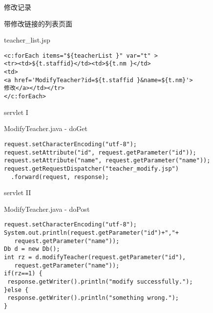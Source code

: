 \documentclass{beamer}
\begin{document}
\begin{frame}{修改记录}

\end{frame}
\begin{frame}[fragile]{带修改链接的列表页面}
\begin{block}{teacher\_list.jsp}
\begin{verbatim}
<c:forEach items="${teacherList }" var="t" >
<tr><td>${t.staffid}</td><td>${t.nm }</td>
<td>
<a href='ModifyTeacher?id=${t.staffid }&name=${t.nm}'>
修改</a></td></tr>
</c:forEach>
\end{verbatim}
\end{block}
\end{frame}

\begin{frame}[fragile]{servlet I}
\begin{block}{ModifyTeacher.java - doGet}
\begin{verbatim}
request.setCharacterEncoding("utf-8");
request.setAttribute("id", request.getParameter("id"));
request.setAttribute("name", request.getParameter("name"));
request.getRequestDispatcher("teacher_modify.jsp")
  .forward(request, response);
\end{verbatim}
\end{block}
\end{frame}

\begin{frame}[fragile]{servlet II}
\begin{block}{ModifyTeacher.java - doPost}
\begin{verbatim}
request.setCharacterEncoding("utf-8");
System.out.println(request.getParameter("id")+","+ 
   request.getParameter("name"));
Db d = new Db();
int rz = d.modifyTeacher(request.getParameter("id"), 
   request.getParameter("name"));
if(rz==1) {
 response.getWriter().println("modify successfully.");
}else {
 response.getWriter().println("something wrong.");
}
\end{verbatim}
\end{block}
\end{frame}
\end{document}
